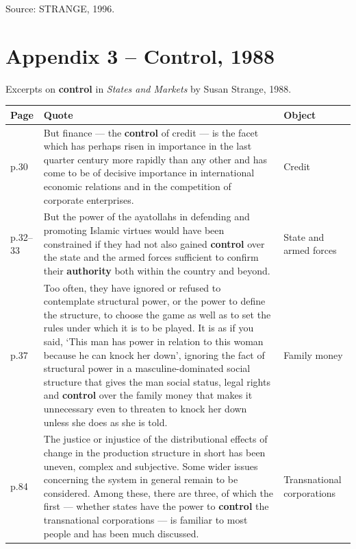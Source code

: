\noindent Source: STRANGE, 1996.

\normalsize

\section*{Appendix 3 -- Control, 1988}

Excerpts on \textbf{control} in \emph{States and Markets} by Susan Strange, 1988.

\small
\begin{longtable}{p{1.2cm} p{9.5cm} p{3.2cm}}
\toprule
\textbf{Page} & \textbf{Quote} & \textbf{Object} \\
\midrule
\endhead

p.30 & But finance --- the \textbf{control} of credit --- is the facet which has perhaps risen in importance in the last quarter century more rapidly than any other and has come to be of decisive importance in international economic relations and in the competition of corporate enterprises. & Credit \\
\midrule

p.32--33 & But the power of the ayatollahs in defending and promoting Islamic virtues would have been constrained if they had not also gained \textbf{control} over the state and the armed forces sufficient to confirm their \textbf{authority} both within the country and beyond. & State and armed forces \\
\midrule

p.37 & Too often, they have ignored or refused to contemplate structural power, or the power to define the structure, to choose the game as well as to set the rules under which it is to be played. It is as if you said, `This man has power in relation to this woman because he can knock her down', ignoring the fact of structural power in a masculine-dominated social structure that gives the man social status, legal rights and \textbf{control} over the family money that makes it unnecessary even to threaten to knock her down unless she does as she is told. & Family money \\
\midrule

p.84 & The justice or injustice of the distributional effects of change in the production structure in short has been uneven, complex and subjective. Some wider issues concerning the system in general remain to be considered. Among these, there are three, of which the first --- whether states have the power to \textbf{control} the transnational corporations --- is familiar to most people and has been much discussed. & Transnational corporations \\
\midrule


\end{longtable}
